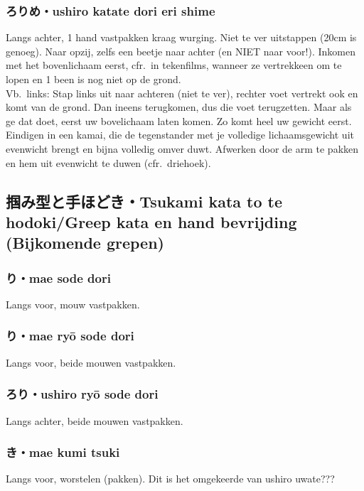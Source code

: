 \subsubsection{ろりめ・ushiro katate dori eri shime}
Langs achter, 1 hand vastpakken kraag wurging. Niet te ver uitstappen (20cm is genoeg). Naar opzij, zelfs een beetje naar achter (en NIET naar voor!). Inkomen met het bovenlichaam eerst, cfr.\ in tekenfilms, wanneer ze vertrekkeen om te lopen en 1 been is nog niet op de grond.\\
Vb.\ links: Stap links uit naar achteren (niet te ver), rechter voet vertrekt ook en komt van de grond. Dan ineens terugkomen, dus die voet terugzetten. Maar als ge dat doet, eerst uw bovelichaam laten komen. Zo komt heel uw gewicht eerst. Eindigen in een kamai, die de tegenstander met je volledige lichaamsgewicht uit evenwicht brengt en bijna volledig omver duwt. Afwerken door de arm te pakken en hem uit evenwicht te duwen (cfr.\ driehoek).

\subsection{掴み型と手ほどき・Tsukami kata to te hodoki/Greep kata en hand bevrijding (Bijkomende grepen)}
\subsubsection{り・mae sode dori}
Langs voor, mouw vastpakken.

\subsubsection{り・mae ry\={o} sode dori}
Langs voor, beide mouwen vastpakken.

\subsubsection{ろり・ushiro ry\={o} sode dori}
Langs achter, beide mouwen vastpakken.

\subsubsection{き・mae kumi tsuki}
Langs voor, worstelen (pakken). Dit is het omgekeerde van ushiro uwate???

